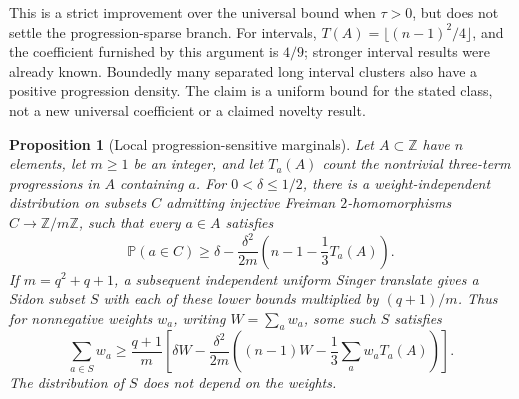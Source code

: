 \documentclass[11pt]{article}
\newtheorem{proposition}[theorem]{Proposition}
\theoremstyle{definition}
\theoremstyle{remark}
\newcommand{\Z}{\mathbb Z}
\newcommand{\Prob}{\mathbb P}
\begin{document}
This is a strict improvement over the universal bound when $\tau>0$,
but does not settle the progression-sparse branch. For intervals,
$T(A)=\lfloor(n-1)^2/4\rfloor$, and the coefficient furnished by this
argument is $4/9$; stronger interval results were already known.
Boundedly many separated long interval clusters also have a positive
progression density. The claim is a uniform bound for the stated
class, not a new universal coefficient or a claimed novelty result.

\begin{proposition}[Local progression-sensitive marginals]\label{prop:weighted-ap}
Let $A\subset\Z$ have $n$ elements, let $m\ge1$ be an integer,
and let $T_a(A)$ count the nontrivial three-term progressions in $A$
containing $a$. For $0<\delta\le1/2$, there is a weight-independent
distribution on subsets $C$ admitting injective Freiman
$2$-homomorphisms $C\to\Z/m\Z$, such that every $a\in A$ satisfies
\[
\Prob(a\in C)\ge\delta-
\frac{\delta^2}{2m}\left(n-1-\frac13T_a(A)\right).
\]
If $m=q^2+q+1$, a subsequent independent uniform Singer translate
gives a Sidon subset $S$ with each of these lower bounds multiplied
by $(q+1)/m$. Thus for nonnegative weights $w_a$, writing
$W=\sum_a w_a$, some such $S$ satisfies
\[
\sum_{a\in S}w_a\ge\frac{q+1}{m}
\left[\delta W-\frac{\delta^2}{2m}
\left((n-1)W-\frac13\sum_a w_aT_a(A)\right)\right].
\]
The distribution of $S$ does not depend on the weights.
\end{proposition}
\end{document}
